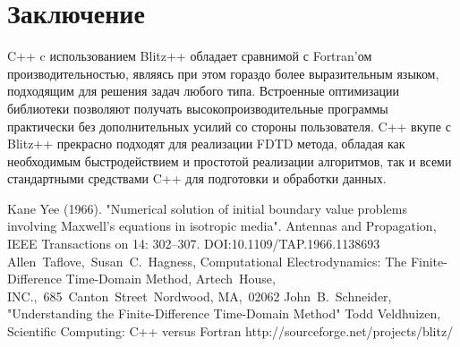 \documentclass[10pt]{article}
\begin{document}
\section{Заключение}
C++ c использованием Blitz++ обладает сравнимой с Fortran'ом производительностью,
являясь при этом гораздо более выразительным языком, подходящим
для решения задач любого типа. Встроенные оптимизации библиотеки позволяют
получать высокопроизводительные программы практически без дополнительных
усилий со стороны пользователя. C++ вкупе с Blitz++ прекрасно подходят 
для реализации FDTD метода, обладая как необходимым быстродействием и 
простотой реализации алгоритмов, так и всеми стандартными средствами C++ 
для подготовки и обработки данных.
\renewcommand{\refname}{Список Литературы}
\begin{thebibliography}{10}
  Kane Yee (1966). "Numerical solution of initial boundary value problems
  involving Maxwell's equations in isotropic media". Antennas and Propagation,
  IEEE Transactions on 14: 302–307. DOI:10.1109/TAP.1966.1138693
  Allen~Taflove,~Susan~C.~Hagness, Computational Electrodynamics: The Finite-
  Difference Time-Domain Method, Artech~House, INC.,~685~Canton~Street~Nordwood,
  MA,~02062
  John~B.~Schneider, "Understanding the Finite-Difference Time-Domain Method"
  Todd Veldhuizen, Scientific Computing: C++ versus Fortran
  http://sourceforge.net/projects/blitz/
\end{thebibliography}
\end{document}
